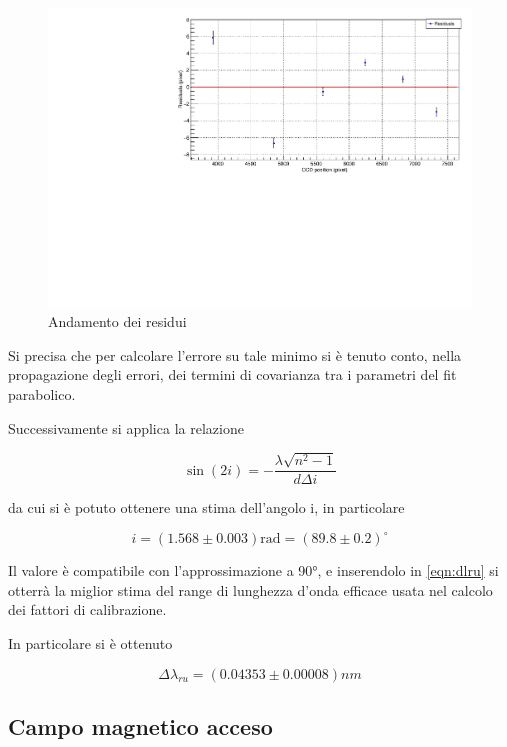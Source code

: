 \documentclass{article}
\begin{document}
	\begin{center}
		\begin{figure}[H]
			\centering
			\includegraphics[scale=0.38, angle=0]{campospento/deltaxruBoffres.pdf}
			\caption{Andamento dei residui}
			\label{fig:deltaxruBoffres}
		\end{figure}
	\end{center}
	

	
	Si precisa che per calcolare l'errore su tale 
	minimo si è tenuto conto, nella propagazione degli errori, dei termini di 
	covarianza tra i parametri del fit parabolico.
	
	Successivamente si applica la relazione

	\begin{equation}
		\sin(2i) = - \frac{\lambda \sqrt{n^2-1}}{d \Delta i}
	\end{equation}

	da cui si è potuto ottenere una stima dell'angolo i, in particolare

	\[
		i = (1.568 \pm 0.003)\text{rad} = ( 89.8 \pm 0.2 ) ^{\circ}
	\]

	Il valore è compatibile con l'approssimazione a 90°, e inserendolo in \ref{eqn:dlru}
	si otterrà la miglior stima del range di lunghezza d'onda efficace usata
	nel calcolo dei fattori di calibrazione.

	In particolare si è ottenuto

	\[
		\Delta\lambda_{ru} = (0.04353 \pm 0.00008) nm 
	\]	

	\subsection*{Campo magnetico acceso}
	
\end{document}
